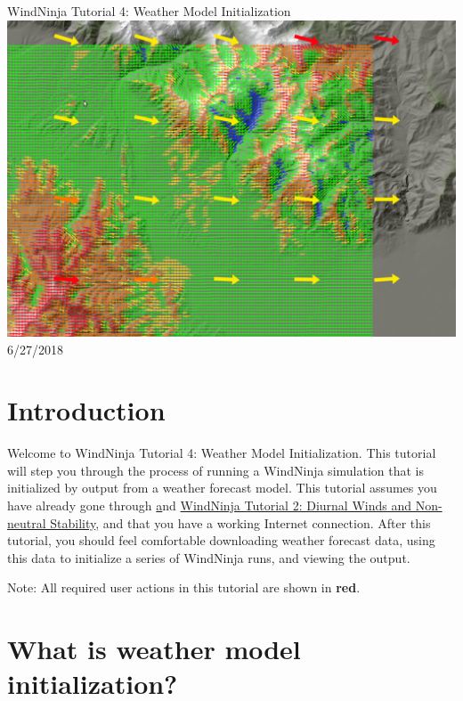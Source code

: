 \documentclass[12pt]{article}
\begin{document}
\begin{titlepage}
    \centering
    {\Huge
       WindNinja Tutorial 4: Weather Model Initialization
    }    
    \vfill
    \includegraphics[scale=0.35]							{title_fig}
    \vfill
  	{\Huge
	  6/27/2018 %
  	}
    \vfill
\end{titlepage}

\section*{Introduction}

Welcome to WindNinja Tutorial 4: Weather Model Initialization.  This tutorial will step you through the process of running a WindNinja simulation that is initialized by output from a weather forecast model.  This tutorial assumes you have already gone through \href{https://weather.firelab.org/windninja/tutorials/WindNinja_tutorial1.pdf} and \href{https://weather.firelab.org/windninja/tutorials/WindNinja_tutorial2.pdf}{WindNinja Tutorial 2: Diurnal Winds and Non-neutral Stability}, and that you have a working Internet connection.  After this tutorial, you should feel comfortable downloading weather forecast data, using this data to initialize a series of WindNinja runs, and viewing the output.
    
Note:  All required user actions in this tutorial are shown in \textbf{\color{red}red}.

\section*{What is weather model initialization?}
\end{document}
